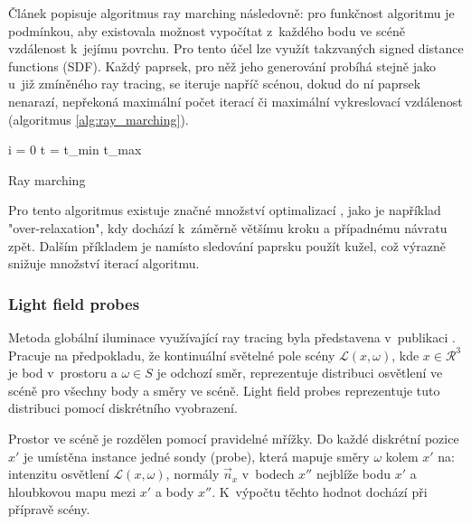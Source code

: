 Článek \cite{sphere_tracing} popisuje algoritmus ray marching následovně: pro funkčnost algoritmu je podmínkou, aby existovala možnost vypočítat z~každého bodu ve scéně vzdálenost k~jejímu povrchu. Pro tento účel lze využít takzvaných signed distance functions (SDF). Každý paprsek, pro něž jeho generování probíhá stejně jako u~již zmíněného ray tracing, se iteruje napříč scénou, dokud do ní paprsek nenarazí, nepřekoná maximální počet iterací či maximální vykreslovací vzdálenost (algoritmus \ref{alg:ray_marching}).


\begin{center}
	\begin{czechalgorithm}[H] \label{alg:ray_marching}
		i = 0\;
		t = t\_min\;
		\KwRet t\_max\;
		\caption{Ray marching}
	\end{czechalgorithm}
\end{center}

Pro tento algoritmus existuje značné množství optimalizací \cite{Keinert2014EnhancedST}, jako je například "over-relaxation", kdy dochází k~záměrně většímu kroku a případnému návratu zpět. Dalším příkladem je namísto sledování paprsku použít kužel, což výrazně snižuje množství iterací algoritmu.


\subsubsection{Light field probes} \label{sec:light_field_probes}
Metoda globální iluminace využívající ray tracing byla představena v~publikaci \cite{light_field_probes}. Pracuje na předpokladu, že kontinuální světelné pole scény $\mathcal{L}(x, \omega)$, kde $x \in \mathcal{R}^3$ je bod v~prostoru a $\omega \in S$ je odchozí směr, reprezentuje distribuci osvětlení ve scéně pro všechny body a směry ve scéně. Light field probes reprezentuje tuto distribuci pomocí diskrétního vyobrazení.

Prostor ve scéně je rozdělen pomocí pravidelné mřížky. Do každé diskrétní pozice $x'$ je umístěna instance jedné sondy (probe), která mapuje směry $\omega$ kolem $x'$ na: intenzitu osvětlení $\mathcal{L}(x, \omega)$, normály $\vec{n}_x$ v~bodech $x''$ nejblíže bodu $x'$ a hloubkovou mapu mezi $x'$ a body $x''$. K~výpočtu těchto hodnot dochází při přípravě scény.

